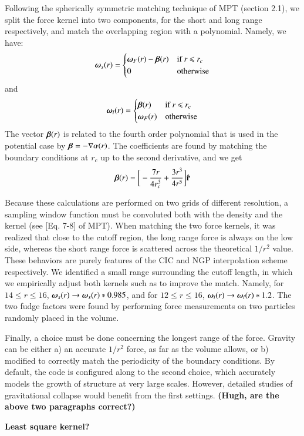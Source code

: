 Following the spherically symmetric matching technique of MPT (section 2.1), 
we split  the force kernel into two components, for the short and long range respectively, and 
match the overlapping region with a polynomial. Namely, we have:
\begin{eqnarray}
\mbox{\boldmath $\omega$}_{s}(r) = \begin{cases} \mbox{\boldmath $\omega$}_{F}(r) -  \mbox{\boldmath $\beta$}(r) &\mbox{if  } \mbox{$r$ $\le$ $r_{c}$ } \\
0 & \mbox{otherwise} 
\end{cases}
\end{eqnarray}
and
\begin{eqnarray}
\mbox{\boldmath $\omega$}_{l}(r) = \begin{cases} \mbox{\boldmath $\beta$}(r) &\mbox{if  } \mbox{$r$ $\le$ $r_{c}$ } \\
 \mbox{\boldmath $\omega$}_{F}(r)  &\mbox{otherwise} 
\end{cases}
\end{eqnarray}
The vector $\mbox{\boldmath $\beta$}(r)$ is related to the fourth order polynomial that is used in the potential case by
 $ \mbox{\boldmath $\beta$} = - {\bf \nabla} \alpha(r)$. The coefficients are found by matching the boundary conditions at $r_{c}$ up to the second derivative,
 and we get
  \begin{eqnarray}
   \mbox{\boldmath $\beta$}(r) = \bigg[ -\frac{7 r}{4 r_{c}^{3}} + \frac{3 r^{3}}{4 r^{5}}\bigg] \hat{\bf r}
  \end{eqnarray}

Because these calculations are performed on two grids of different resolution, a sampling window function must be convoluted 
both with the density and the kernel (see [Eq. 7-8] of MPT).
When matching the two  force kernels, it was realized that close to the cutoff region, the long range force is always on the low side, whereas 
the short range force is scattered across the theoretical $1/r^2$ value. These behaviors are purely features of the CIC and NGP interpolation scheme 
respectively. We identified a small range surrounding the cutoff length, in which we empirically adjust both kernels such as to improve 
the match. Namely, for $14 \le r \le 16$, $\mbox{\boldmath $\omega$}_{s}({r}) \rightarrow \mbox{\boldmath $\omega$}_{s}({ r})*0.985$,
and for  $12 \le r \le 16$, $\mbox{\boldmath $\omega$}_{l}({r}) \rightarrow \mbox{\boldmath $\omega$}_{l}({ r})*1.2$.
The two fudge factors were found by performing force measurements on two particles randomly placed in the volume.

Finally, a choice must be done concerning the longest range of the force. Gravity can be either a) an accurate $1/r^2$ force, as far as the volume allows, 
or b) modified to correctly match the periodicity of the boundary conditions. By default, the code is configured along to the second choice,
which accurately models the growth of structure at very large scales. However, detailed studies of gravitational collapse would benefit 
from the first settings. {\bf (Hugh, are the above two paragraphs correct?)}

{\bf Least square kernel?}
